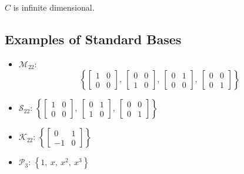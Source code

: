 \documentclass{article}
\begin{document}
\begin{multicols*}{3}
    \(C\) is infinite dimensional.
    \subsection{Examples of Standard Bases}
    \begin{itemize}
        \item \(\mathscr{M}_{22}\):
              \begin{equation*}
                  \left\{ \begin{bmatrix*}
                      1 & 0 \\
                      0 & 0
                  \end{bmatrix*},\: \begin{bmatrix*}
                      0 & 0 \\
                      1 & 0
                  \end{bmatrix*},\: \begin{bmatrix*}
                      0 & 1 \\
                      0 & 0
                  \end{bmatrix*},\: \begin{bmatrix*}
                      0 & 0 \\
                      0 & 1
                  \end{bmatrix*} \right\}
              \end{equation*}
        \item \(\mathscr{S}_{22}\): \(\left\{ \begin{bmatrix*}
                  1 & 0 \\
                  0 & 0
              \end{bmatrix*},\: \begin{bmatrix*}
                  0 & 1 \\
                  1 & 0
              \end{bmatrix*},\: \begin{bmatrix*}
                  0 & 0 \\
                  0 & 1
              \end{bmatrix*} \right\}\)
        \item \(\mathscr{K}_{22}\): \(\left\{ \begin{bmatrix*}
                  0 & 1 \\
                  -1 & 0
              \end{bmatrix*}\right\}\)
        \item \(\mathscr{P}_3\): \(\left\{ 1,\: x,\: x^2,\: x^3 \right\}\)
    \end{itemize}

\end{multicols*}
\end{document}
